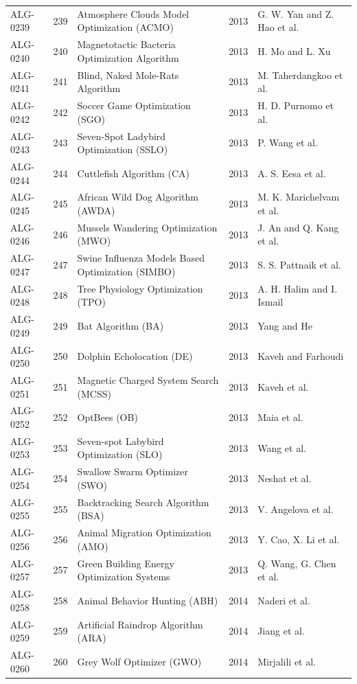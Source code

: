 \documentclass[8pt]{article}
\begin{document}
\begin{landscape}
\begin{longtable}{P{1.7cm}rP{10.0cm}rP{7.2cm}}
ALG-0239 & 239 & Atmosphere Clouds Model Optimization (ACMO) & 2013 & G. W. Yan and Z. Hao et al. \\
ALG-0240 & 240 & Magnetotactic Bacteria Optimization Algorithm & 2013 & H. Mo and L. Xu \\
ALG-0241 & 241 & Blind, Naked Mole-Rats Algorithm & 2013 & M. Taherdangkoo et al. \\
ALG-0242 & 242 & Soccer Game Optimization (SGO) & 2013 & H. D. Purnomo et al. \\
ALG-0243 & 243 & Seven-Spot Ladybird Optimization (SSLO) & 2013 & P. Wang et al. \\
ALG-0244 & 244 & Cuttlefish Algorithm (CA) & 2013 & A. S. Eesa et al. \\
ALG-0245 & 245 & African Wild Dog Algorithm (AWDA) & 2013 & M. K. Marichelvam et al. \\
ALG-0246 & 246 & Mussels Wandering Optimization (MWO) & 2013 & J. An and Q. Kang et al. \\
ALG-0247 & 247 & Swine Influenza Models Based Optimization (SIMBO) & 2013 & S. S. Pattnaik et al. \\
ALG-0248 & 248 & Tree Physiology Optimization (TPO) & 2013 & A. H. Halim and I. Ismail \\
ALG-0249 & 249 & Bat Algorithm (BA) & 2013 & Yang and He \\
ALG-0250 & 250 & Dolphin Echolocation (DE) & 2013 & Kaveh and Farhoudi \\
ALG-0251 & 251 & Magnetic Charged System Search (MCSS) & 2013 & Kaveh et al. \\
ALG-0252 & 252 & OptBees (OB) & 2013 & Maia et al. \\
ALG-0253 & 253 & Seven-spot Labybird Optimization (SLO) & 2013 & Wang et al. \\
ALG-0254 & 254 & Swallow Swarm Optimizer (SWO) & 2013 & Neshat et al. \\
ALG-0255 & 255 & Backtracking Search Algorithm (BSA) & 2013 & V. Angelova et al. \\
ALG-0256 & 256 & Animal Migration Optimization (AMO) & 2013 & Y. Cao, X. Li et al. \\
ALG-0257 & 257 & Green Building Energy Optimization Systems & 2013 & Q. Wang, G. Chen et al. \\
ALG-0258 & 258 & Animal Behavior Hunting (ABH) & 2014 & Naderi et al. \\
ALG-0259 & 259 & Artificial Raindrop Algorithm (ARA) & 2014 & Jiang et al. \\
ALG-0260 & 260 & Grey Wolf Optimizer (GWO) & 2014 & Mirjalili et al. \\

\end{longtable}
\end{landscape}
\end{document}
